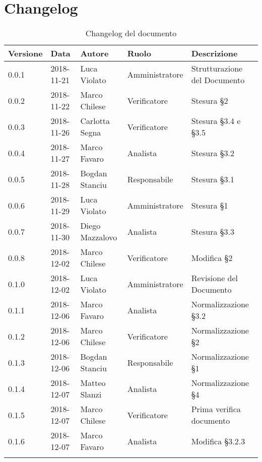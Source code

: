\section{Changelog}

\begin{center}
\begin{longtable}[c]{|m{}|m{}|m{}|m{}|p{}|}
\hline
\textbf{Versione} & \textbf{Data} & \textbf{Autore} & \textbf{Ruolo} & \textbf{Descrizione} \\
\hline \hline
\endfirsthead
0.0.1 & 2018-11-21 & Luca Violato & Amministratore & Strutturazione del Documento \\
\hline
0.0.2 & 2018-11-22 & Marco Chilese & Verificatore & Stesura §2 \\
\hline
0.0.3 & 2018-11-26 & Carlotta Segna & Verificatore & Stesura §3.4 e §3.5 \\
\hline
0.0.4 & 2018-11-27 & Marco Favaro & Analista & Stesura §3.2 \\
\hline
0.0.5 & 2018-11-28 & Bogdan Stanciu & Responsabile & Stesura §3.1\\
\hline
0.0.6 & 2018-11-29 & Luca Violato & Amministratore & Stesura §1 \\
\hline
0.0.7 & 2018-11-30 & Diego Mazzalovo & Analista & Stesura §3.3 \\
\hline
0.0.8 & 2018-12-02 & Marco Chilese & Verificatore & Modifica §2 \\
\hline
0.1.0 & 2018-12-02 & Luca Violato & Amministratore & Revisione del Documento\\
\hline
0.1.1 & 2018-12-06 & Marco Favaro & Analista & Normalizzazione §3.2\\
\hline
0.1.2 & 2018-12-06 & Marco Chilese & Verificatore & Normalizzazione §2\\
\hline
0.1.3 & 2018-12-06 & Bogdan Stanciu & Responsabile & Normalizzazione §1\\
\hline
0.1.4 & 2018-12-07 & Matteo Slanzi & Analista & Normalizzazione §4\\
\hline
0.1.5 & 2018-12-07 & Marco Chilese & Verificatore & Prima verifica documento\\
\hline
0.1.6 & 2018-12-07 & Marco Favaro & Analista & Modifica §3.2.3\\
\hline
\caption{Changelog del documento}
\end{longtable}
\end{center}

